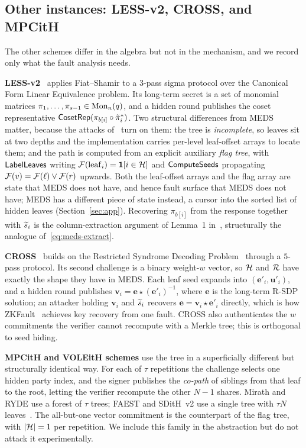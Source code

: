 \subsection{Other instances: LESS-v2, CROSS, and MPCitH}
\label{sec:others}

The other schemes differ in the algebra but not in the mechanism, and we
record only what the fault analysis needs.

\textbf{LESS-v2}~\cite{LESS-spec} applies Fiat--Shamir to a $3$-pass sigma
protocol over the Canonical Form Linear Equivalence problem. Its long-term
secret is a set of monomial matrices $\pi_1,\ldots,\pi_{s-1} \in \mathrm{Mon}_n(q)$,
and a hidden round publishes the coset representative
$\mathsf{CosetRep}(\pi_{b[i]} \circ \tilde{\pi}^*_i)$. Two structural differences from
MEDS matter, because the attacks of~\cite{ZKFault,FaultToForge2025} turn on
them: the tree is \emph{incomplete}, so leaves sit at two depths and the
implementation carries per-level leaf-offset arrays to locate them; and the
path is computed from an explicit auxiliary \emph{flag tree}, with
$\mathsf{LabelLeaves}$ writing $\mathcal{F}(\mathrm{leaf}_i) = \mathbf{1}[i \in \mathcal{H}]$ and
$\mathsf{ComputeSeeds}$ propagating $\mathcal{F}(v) = \mathcal{F}(\ell) \vee \mathcal{F}(r)$ upwards.
Both the leaf-offset arrays and the flag array are state that MEDS does not
have, and hence fault surface that MEDS does not have; MEDS has a different
piece of state instead, a cursor into the sorted list of hidden leaves
(Section~\ref{sec:app}). Recovering $\pi_{b[i]}$
from the response together with $\widetilde{s}_i$ is the column-extraction argument
of Lemma~1 in~\cite{FaultToForge2025}, structurally the analogue
of~\eqref{eq:meds-extract}.

\textbf{CROSS}~\cite{CROSSspec} builds on the Restricted Syndrome Decoding
Problem~\cite{BaldiBPSWW24} through a $5$-pass protocol. Its second challenge
is a binary weight-$w$ vector, so $\mathcal{H}$ and $\mathcal{R}$ have exactly the shape
they have in MEDS. Each leaf seed expands into $(\mathbf{e}'_i,
\mathbf{u}'_i)$, and a hidden round publishes $\mathbf{v}_i = \mathbf{e} \star
(\mathbf{e}'_i)^{-1}$, where $\mathbf{e}$ is the long-term R-SDP solution; an
attacker holding $\mathbf{v}_i$ and $\widetilde{s}_i$ recovers $\mathbf{e} =
\mathbf{v}_i \star \mathbf{e}'_i$ directly, which is how
ZKFault~\cite{ZKFault} achieves key recovery from one fault. CROSS also
authenticates the $w$ commitments the verifier cannot recompute with a Merkle
tree; this is orthogonal to seed hiding.

\textbf{MPCitH and VOLEitH schemes} use the tree in a superficially different
but structurally identical way. For each of $\tau$ repetitions the challenge
selects one hidden party index, and the signer publishes the \emph{co-path} of
siblings from that leaf to the root, letting the verifier recompute the other
$N-1$ shares. Mirath and RYDE use a forest of $\tau$ trees; FAEST and SDitH~v2
use a single tree with $\tau N$ leaves~\cite{OneTree}. The all-but-one vector
commitment is the counterpart of the flag tree, with $|\mathcal{H}| = 1$ per
repetition. We include this family in the abstraction but do not attack it
experimentally.
